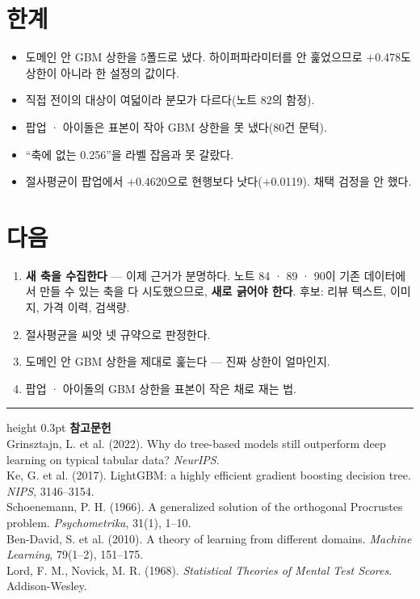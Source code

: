 \documentclass[10pt]{article}
\begin{document}

\section{한계}

\begin{itemize}[leftmargin=1.1em,itemsep=0.15em]
\item 도메인 안 GBM 상한을 5폴드로 냈다. 하이퍼파라미터를 안 훑었으므로
      $+$0.478도 상한이 아니라 한 설정의 값이다.
\item 직접 전이의 대상이 여덟이라 분모가 다르다(노트 82의 함정).
\item 팝업 · 아이돌은 표본이 작아 GBM 상한을 못 냈다(80건 문턱).
\item ``축에 없는 0.256''을 라벨 잡음과 못 갈랐다.
\item 절사평균이 팝업에서 $+$0.4620으로 현행보다 낫다($+$0.0119). 채택 검정을
      안 했다.
\end{itemize}

\section{다음}

\begin{enumerate}[leftmargin=1.3em,itemsep=0.15em]
\item \textbf{새 축을 수집한다} --- 이제 근거가 분명하다. 노트 84 · 89 · 90이
      기존 데이터에서 만들 수 있는 축을 다 시도했으므로, \textbf{새로 긁어야
      한다}. 후보: 리뷰 텍스트, 이미지, 가격 이력, 검색량.
\item 절사평균을 씨앗 넷 규약으로 판정한다.
\item 도메인 안 GBM 상한을 제대로 훑는다 --- 진짜 상한이 얼마인지.
\item 팝업 · 아이돌의 GBM 상한을 표본이 작은 채로 재는 법.
\end{enumerate}

\vspace{0.6em}
\hrule height 0.3pt
\vspace{0.5em}
{\footnotesize
\textbf{참고문헌}\\[0.3em]
Grinsztajn, L. et al. (2022). Why do tree-based models still outperform deep
learning on typical tabular data? \emph{NeurIPS}.\\[0.15em]
Ke, G. et al. (2017). LightGBM: a highly efficient gradient boosting decision
tree. \emph{NIPS}, 3146--3154.\\[0.15em]
Schoenemann, P. H. (1966). A generalized solution of the orthogonal Procrustes
problem. \emph{Psychometrika}, 31(1), 1--10.\\[0.15em]
Ben-David, S. et al. (2010). A theory of learning from different domains.
\emph{Machine Learning}, 79(1--2), 151--175.\\[0.15em]
Lord, F. M., Novick, M. R. (1968). \emph{Statistical Theories of Mental Test
Scores}. Addison-Wesley.
}
\end{document}
